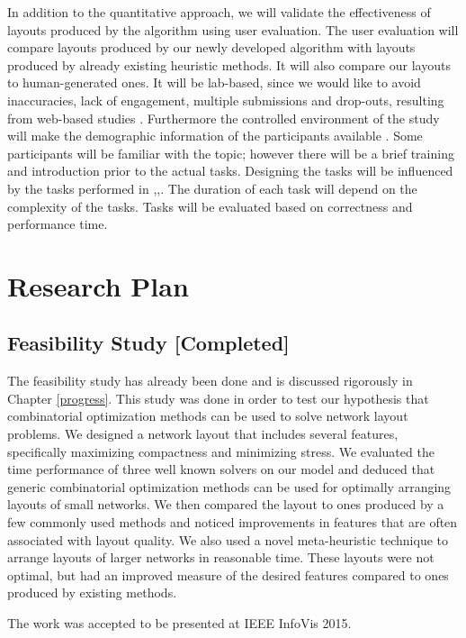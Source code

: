 \documentclass[a4paper,11pt,phdthesis,singlespace,twoside]{cssethesis}
\begin{document}
In addition to the quantitative approach, we will validate the effectiveness of layouts produced by the algorithm using user evaluation. The user evaluation will compare layouts produced by our newly developed algorithm with layouts produced by already existing heuristic methods. It will also compare our layouts to human-generated ones. It will be lab-based, since we would like to avoid inaccuracies, lack of engagement, multiple submissions and drop-outs, resulting from web-based studies \cite{bbc}. Furthermore the controlled environment of the study will make the demographic information of the participants available \cite{purchase2012graph}. Some participants will be familiar with the topic; however there will be a brief training and introduction prior to the actual tasks. Designing the tasks will be influenced by the tasks performed in \cite{dwyer2009comparison},\cite{purchase2012graph},\cite{kieffer2015hola}. The duration of each task will depend on the complexity of the tasks. Tasks will be evaluated based on correctness and performance time.

\section{Research Plan}\label{plan}

\subsection{Feasibility Study [Completed]}
The feasibility study has already been done and is discussed rigorously in Chapter \ref{progress}. This study was done in order to test our hypothesis that combinatorial optimization methods can be used to solve network layout problems. We designed a network layout that includes several features, specifically maximizing compactness and minimizing stress. We evaluated the time performance of three well known solvers on our model and deduced that generic combinatorial optimization methods can be used for optimally arranging layouts of small networks. We then compared the layout to ones produced by a few commonly used methods and noticed improvements in features that are often associated with layout quality.
We also used a novel meta-heuristic technique to arrange layouts of larger networks in reasonable time. These layouts were not optimal, but had an improved measure of the desired features compared to ones produced by existing methods.

The work was accepted to be presented at IEEE InfoVis 2015.
\end{document}
